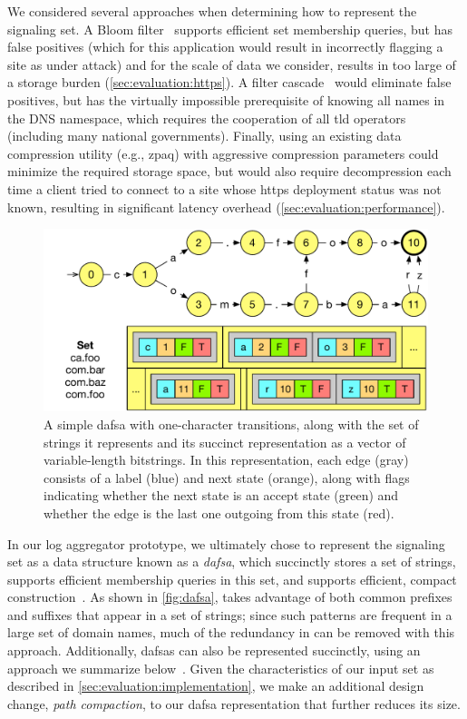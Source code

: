 We considered several approaches when determining how to represent the signaling
set. A Bloom filter~\cite{bloom1970space} supports efficient set membership
queries, but has false positives (which for this application would result in
incorrectly flagging a site as under attack) and for the scale of data we
consider, results in too large of a storage burden
(\autoref{sec:evaluation:https}). A filter cascade~\cite{salikhov2014using}
would eliminate false positives, but has the virtually impossible prerequisite
of knowing all names in the DNS namespace, which requires the cooperation of all
\ac{tld} operators (including many national governments). Finally, using an
existing data compression utility (e.g., zpaq) with aggressive compression
parameters could minimize the required storage space, but would also require
decompression each time a client tried to connect to a site whose \ac{https}
deployment status was not known, resulting in significant latency overhead
(\autoref{sec:evaluation:performance}).

\begin{figure}
  \centering
  \includegraphics[width=\linewidth]{fig/dafsa}
  \caption{A simple \ac{dafsa} with one-character transitions, along with the
    set of strings it represents and its succinct representation as a vector of
    variable-length bitstrings. In this representation, each edge (gray)
    consists of a label (blue) and next state (orange), along with flags
  indicating whether the next state is an accept state (green) and whether the
edge is the last one outgoing from this state (red).}
  \label{fig:dafsa}
\end{figure}

In our log aggregator prototype, we ultimately chose to represent the signaling
set as a data structure known as a \emph{\acf{dafsa}}, which succinctly stores a
set of strings, supports efficient membership queries in this set, and supports 
efficient, compact construction~\cite{daciuk2000incremental}. As shown
in \autoref{fig:dafsa},  takes advantage of both common prefixes and
suffixes that appear in a set of strings; since such patterns are frequent in a
large set of domain names, much of the redundancy in \httpsset can be removed with this
approach. Additionally, \acp{dafsa} can also be represented succinctly, using an
approach we summarize below~\cite{daciuk2012smaller}. Given the characteristics
of our input set as described in \autoref{sec:evaluation:implementation}, we
make an additional design change, \emph{path compaction},
to our \ac{dafsa} representation that further reduces its size.

